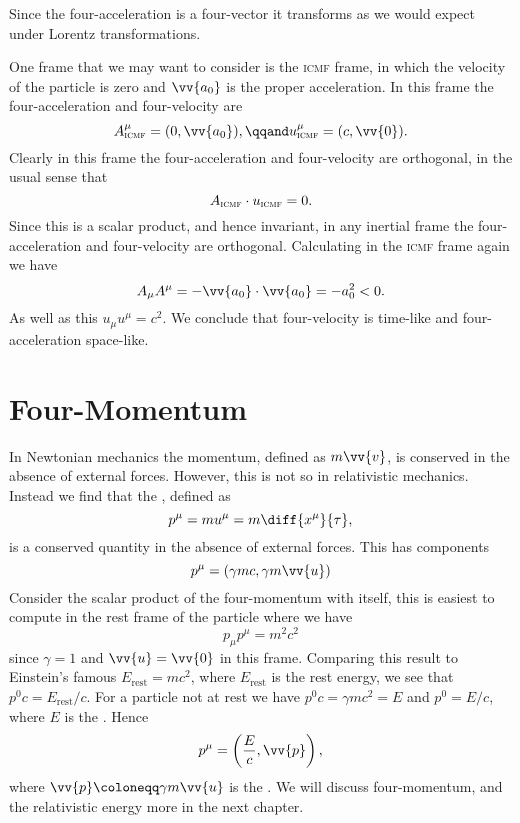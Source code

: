 \documentclass[fleqn]{NotesClass}
\newcommand{\ICMF}{\textsc{icmf}}
\begin{document}
    Since the four-acceleration is a four-vector it transforms as we would expect under Lorentz transformations.
    
    One frame that we may want to consider is the \ICMF{} frame, in which the velocity of the particle is zero and \(\vv{a_0}\) is the proper acceleration.
    In this frame the four-acceleration and four-velocity are
    \begin{equation}
        A^\mu_{\ICMF} = (0, \vv{a_0}), \qqand u^\mu_{\ICMF} = (c, \vv{0}).
    \end{equation}
    Clearly in this frame the four-acceleration and four-velocity are orthogonal, in the usual sense that
    \begin{equation}
        A_{\ICMF} \cdot u_{\ICMF} = 0.
    \end{equation}
    Since this is a scalar product, and hence invariant, in any inertial frame the four-acceleration and four-velocity are orthogonal.
    Calculating in the \ICMF{} frame again we have
    \begin{equation}
        A_\mu A^\mu = -\vv{a_0}\cdot\vv{a_0} = -a_0^2 < 0.
    \end{equation}
    As well as this \(u_\mu u^\mu = c^2\).
    We conclude that four-velocity is time-like and four-acceleration space-like.
    
    \section{Four-Momentum}
    In Newtonian mechanics the momentum, defined as \(m\vv{v}\), is conserved in the absence of external forces.
    However, this is not so in relativistic mechanics.
    Instead we find that the , defined as
    \begin{equation}
        p^\mu = mu^\mu = m\diff{x^\mu}{\tau},
    \end{equation}
    is a conserved quantity in the absence of external forces.
    This has components
    \begin{equation}
        p^\mu = (\gamma mc, \gamma m\vv{u})
    \end{equation}
    Consider the scalar product of the four-momentum with itself, this is easiest to compute in the rest frame of the particle where we have
    \begin{equation}
        p_\mu p^\mu = m^2c^2
    \end{equation}
    since \(\gamma = 1\) and \(\vv{u} = \vv{0}\) in this frame.
    Comparing this result to Einstein's famous \(E_{\mathrm{rest}} = mc^2\), where \(E_{\mathrm{rest}}\) is the rest energy, we see that \(p^0c = E_{\mathrm{rest}}/c\).
    For a particle not at rest we have \(p^0c = \gamma mc^2 = E\)  and \(p^0 = E/c\), where \(E\) is the .
    Hence
    \begin{equation}
        p^\mu = \left( \frac{E}{c}, \vv{p} \right),
    \end{equation}
    where \(\vv{p} \coloneqq \gamma m\vv{u}\) is the .
    We will discuss four-momentum, and the relativistic energy more in the next chapter.
    
\end{document}
